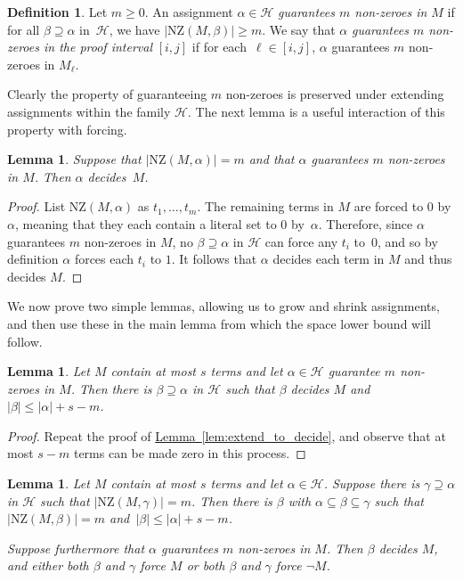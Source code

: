 \documentclass[11pt]{article}
\numberwithin{equation}{section}
\newtheorem{lemma}[theorem]{Lemma}
\theoremstyle{definition}
\newtheorem{definition}[theorem]{Definition}
\theoremstyle{plain}
\newcommand{\expref}[2]{\hyperref[#2]{#1~\ref{#2}}}
\newcommand\calH{\mathcal{H}}
\newcommand\rmNZ{\mathrm{NZ}}
\begin{document}
\begin{definition}
Let $m\geq 0$. 
An assignment $\alpha \in \calH$ \emph{guarantees $m$ non-zeroes in $M$} 
if for all $\beta \supseteq \alpha$ in~$\calH$, we have
  $|\rmNZ(M, \beta)| \ge m$.
We say that $\alpha$ \emph{guarantees $m$ non-zeroes in the proof interval}
$[i,j]$ if for each~$\ell\in [i,j]$, $\alpha$ {guarantees $m$ non-zeroes in $M_\ell$}.
\end{definition}

Clearly the property of guaranteeing $m$ non-zeroes is preserved
under extending assignments within the family $\calH$. 
The next lemma is a useful interaction of this property with forcing.

 \begin{lemma}
\label{lem:NNZ_fixing}
Suppose that $|\rmNZ(M, \alpha)| = m$ and that $\alpha$ guarantees $m$ 
non-zeroes in $M$.
Then $\alpha$ decides~$M$.
\end{lemma}

\begin{proof}
List $\rmNZ(M, \alpha)$ as $t_1, \dots, t_m$.
The remaining terms in $M$ are forced to $0$ by $\alpha$,
meaning that they each contain a literal set to $0$ by~$\alpha$.
Therefore, since $\alpha$ guarantees $m$ non-zeroes in $M$, 
no $\beta \supseteq \alpha$ in $\calH$ can force any $t_i$ to~$0$, 
and so by definition $\alpha$ forces each $t_i$ to $1$.
It follows that $\alpha$ decides each term in $M$ and thus decides $M$.
\end{proof}

We now prove two simple lemmas, allowing us to grow and shrink assignments,
and then use these in the main lemma from which the space lower bound will follow.

\begin{lemma} \label{lem:gen}
Let $M$ contain at most $s$ terms and let $\alpha \in \calH$ guarantee $m$ non-zeroes in $M$. 
Then there is $\beta \supseteq \alpha$ in $\calH$ such that $\beta$ decides $M$ and $|\beta| \leq |\alpha|+ s - m$. 
\end{lemma}

\begin{proof}
Repeat the proof of \expref{Lemma}{lem:extend_to_decide},
and observe that at most $s-m$ terms can be 
made zero in this process.
\end{proof}



\begin{lemma}
\label{lem:loc}
Let $M$ contain at most $s$ terms and let $\alpha \in \calH$. 
Suppose there is $\gamma\supseteq \alpha$ in $\calH$ such that \mbox{$|\rmNZ(M, \gamma)|=m$}. 
Then there is $\beta$ with $\alpha \subseteq \beta \subseteq \gamma$ such that $|\rmNZ(M, \beta)|=m$
and~$|\beta| \leq |\alpha| + s-m$.

Suppose furthermore that $\alpha$ guarantees $m$ non-zeroes in $M$.
Then $\beta$ decides $M$, and either both $\beta$ and $\gamma$ force $M$
or both $\beta$ and $\gamma$ force $\neg M$.
\end{lemma}
\end{document}
